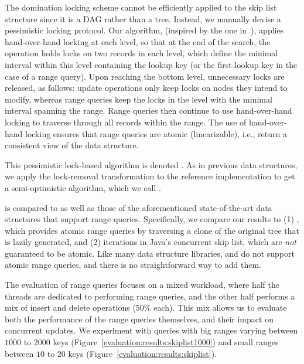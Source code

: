 The domination locking scheme cannot be efficiently applied to the skip list
structure since it is a DAG rather than a tree. Instead, we
manually devise a pessimistic locking protocol. Our
algorithm, (inspired by the one in~\cite{HerlihyS2008}), applies
hand-over-hand locking at each level, so that at the end of the search, the
operation holds locks on two records in each level, which define the minimal interval within this level
containing the lookup key (or the first lookup key in the case of a range query). Upon
reaching the bottom level, unnecessary locks are released, as follows: update operations only keep
locks on nodes they intend to modify, whereas
range
queries keep the locks in the level with the minimal interval spanning the
range. Range queries then continue to use hand-over-hand locking to traverse through all records
within the range. The use of hand-over-hand locking ensures that range queries are atomic
(linearizable), i.e., return a consistent view of the data structure.

This pessimistic lock-based algorithm is denoted \domSkiplist.
As in previous data structures, we  apply the lock-removal transformation to the
reference implementation to get a semi-optimistic algorithm, which we call
\autoSkiplist.

\autoSkiplist is compared to \domSkiplist as well as those of the aforementioned
state-of-the-art data structures that support range queries. Specifically,
we compare our results to (1)
\bronson, which provides atomic range queries by traversing a clone of the
original tree that is lazily generated, and (2)
iterations in Java's concurrent skip list, which are \emph{not}
guaranteed to be atomic. Like many data structure libraries, \danaTree and \danaAVL
do not support atomic range queries, and
there is no straightforward way to add them.

The evaluation of range queries focuses on a mixed workload, where half the
threads are dedicated to performing range queries, and the other half performs a
mix of insert and delete operations (50\% each).
This mix allows us to evaluate both the performance of the range queries themselves,
and their impact on concurrent updates.
We experiment with queries with big ranges varying between $1000$ to $2000$ keys
(Figure~\ref{evaluation:results:skiplist1000}) and small ranges
between $10$ to $20$
keys (Figure~\ref{evaluation:results:skiplist}).


